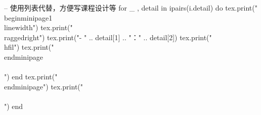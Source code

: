 \documentclass[10pt, a4paper, oneside]{ctexart}
\begin{document}
\begin{center}
\begin{minipage}{0.9\textwidth}
\begin{luacode}
                -- 使用列表代替，方便写课程设计等
                for _ , detail in ipairs(i.detail) do
                    tex.print("\\begin{minipage}{1\\linewidth}")
                    tex.print("\\raggedright")
                    tex.print("- " .. detail[1] .. "：" .. detail[2])
                    tex.print("\\hfil")
                    tex.print("\\end{minipage}\\\\[0.5em]")
                end
                tex.print("\\end{minipage}")
                tex.print("\\\\[0.5em]")
            end
        \end{luacode}
    \end{minipage}
\end{center}
\fi
\end{document}
